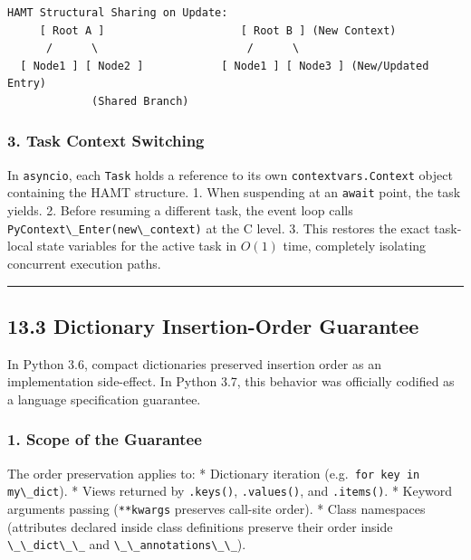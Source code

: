 \begin{lstlisting}
HAMT Structural Sharing on Update:
     [ Root A ]                     [ Root B ] (New Context)
      /      \                       /      \
  [ Node1 ] [ Node2 ]            [ Node1 ] [ Node3 ] (New/Updated Entry)
             (Shared Branch)
\end{lstlisting}

\hypertarget{task-context-switching}{%
\subsubsection{3. Task Context Switching}\label{task-context-switching}}

In \passthrough{\lstinline!asyncio!}, each
\passthrough{\lstinline!Task!} holds a reference to its own
\passthrough{\lstinline!contextvars.Context!} object containing the HAMT
structure. 1. When suspending at an \passthrough{\lstinline!await!}
point, the task yields. 2. Before resuming a different task, the event
loop calls \passthrough{\lstinline!PyContext\_Enter(new\_context)!} at
the C level. 3. This restores the exact task-local state variables for
the active task in \(O(1)\) time, completely isolating concurrent
execution paths.

\begin{center}\rule{0.5\linewidth}{0.5pt}\end{center}

\hypertarget{dictionary-insertion-order-guarantee}{%
\subsection{13.3 Dictionary Insertion-Order
Guarantee}\label{dictionary-insertion-order-guarantee}}

In Python 3.6, compact dictionaries preserved insertion order as an
implementation side-effect. In Python 3.7, this behavior was officially
codified as a language specification guarantee.

\hypertarget{scope-of-the-guarantee}{%
\subsubsection{1. Scope of the Guarantee}\label{scope-of-the-guarantee}}

The order preservation applies to: * Dictionary iteration
(e.g.~\passthrough{\lstinline!for key in my\_dict!}). * Views returned
by \passthrough{\lstinline!.keys()!},
\passthrough{\lstinline!.values()!}, and
\passthrough{\lstinline!.items()!}. * Keyword arguments passing
(\passthrough{\lstinline!**kwargs!} preserves call-site order). * Class
namespaces (attributes declared inside class definitions preserve their
order inside \passthrough{\lstinline!\_\_dict\_\_!} and
\passthrough{\lstinline!\_\_annotations\_\_!}).

